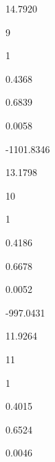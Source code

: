 \documentclass[a4paper,portrait,12pt]{article}
\begin{document}
14.7920





9





1





0.4368





0.6839





0.0058





-1101.8346





13.1798





10





1





0.4186





0.6678





0.0052





-997.0431





11.9264





11





1





0.4015





0.6524





0.0046
\end{document}
